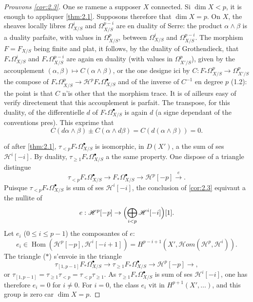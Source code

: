 \documentclass[12pt,a4paper]{article}
\theoremstyle{plain}
\theoremstyle{definition}
\theoremstyle{remark}
\DeclareMathOperator{\Hom}{Hom}
\begin{document}
\begin{proof}[Prouvons \ref{cor:2.3}]
One se ramene a supposer $X$ connected. Si $\dim X < p$, it is enough to appliquer \ref{thm:2.1}. Supposons therefore that $\dim X = p$. On $X$, the sheaves locally libres $\Omega^i_{X/S}$ and $\Omega^{p-i}_{X/S}$ are en duality of Serre: the product $\alpha \wedge \beta$ is a duality parfaite, with values in $\Omega^p_{X/S}$, between $\Omega^i_{X/S}$ and $\Omega^{p-i}_{X/S}$. The morphism $F = F_{X/S}$ being finite and plat, it follows, by the duality of Grothendieck, that $F_* \Omega^i_{X/S}$ and $F_* \Omega^{p-i}_{X/S}$ are again en duality (with values in $\Omega^p_{X'/S}$), given by the accouplement $(\alpha, \beta) \mapsto C(\alpha \wedge \beta)$, or the one designe ici by $C: F_* \Omega^p_{X/S} \to \Omega^p_{X'/S}$ the compose of $F_* \Omega^p_{X/S} \to \mathscr{H}^p F_* \Omega^{\bullet}_{X/S}$ and of the inverse of $C^{-1}$ en degree $p$ (1.2): the point is that $C$ n'is other that the morphism trace. It is of ailleurs easy of verify directement that this accouplement is parfait. The transpose, for this duality, of the differentielle $d$ of $F_* \Omega^{\bullet}_{X/S}$ is again $d$ (a signe dependant of the conventions pres). This exprime that
\[
C(d\alpha \wedge \beta) \pm C(\alpha \wedge d\beta) = C(d(\alpha \wedge \beta)) = 0.
\]

of after \ref{thm:2.1}, $\tau_{<p} F_* \Omega^{\bullet}_{X/S}$ is isomorphic, in $D(X')$, a the sum of ses $\mathscr{H}^i[-i]$. By duality, $\tau_{\ge 1} F_* \Omega^{\bullet}_{X/S}$ a the same property. One dispose of a triangle distingue
\begin{equation}\label{eq:star}
\tau_{<p} F_* \Omega^{\bullet}_{X/S} \to F_* \Omega^{\bullet}_{X/S} \to \mathscr{H}^p[-p] \xrightarrow{e}.
\tag{$*$}
\end{equation}
Puisque $\tau_{<p} F_* \Omega^{\bullet}_{X/S}$ is sum of ses $\mathscr{H}^i[-i]$, the conclusion of \ref{cor:2.3} equivaut a the nullite of
\[
e: \mathscr{H}^p[-p] \to \Bigl(\bigoplus_{i < p} \mathscr{H}^i[-i]\Bigr)[1].
\]
Let $e_i$ ($0 \le i \le p-1$) the composantes of $e$:
\[
e_i \in \Hom(\mathscr{H}^p[-p], \mathscr{H}^i[-i+1]) = H^{p-i+1}(X', \mathscr{H}om(\mathscr{H}^p, \mathscr{H}^i)).
\]
The triangle ($*$) s'envoie in the triangle
\[
\tau_{[1,p-1]} F_* \Omega^{\bullet}_{X/S} \to \tau_{\ge 1} F_* \Omega^{\bullet}_{X/S} \to \mathscr{H}^p[-p] \to,
\]
or $\tau_{[1,p-1]} = \tau_{\ge 1} \tau_{<p} = \tau_{<p} \tau_{\ge 1}$. As $\tau_{\ge 1} F_* \Omega^{\bullet}_{X/S}$ is sum of ses $\mathscr{H}^i[-i]$, one has therefore $e_i = 0$ for $i \neq 0$. For $i = 0$, the class $e_i$ vit in $H^{p+1}(X', \ldots)$, and this group is zero car $\dim X = p$.
\end{proof}
\end{document}
